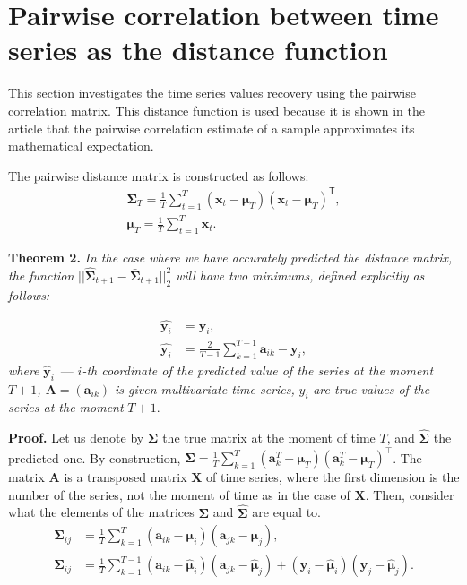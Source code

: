 \documentclass{article}
\begin{document}
\section{Pairwise correlation between time series as the distance function}

This section investigates the time series values recovery using the pairwise correlation matrix. This distance function is used because it is shown in the article\cite{puchkin2023sharper} that the pairwise correlation estimate of a sample approximates its mathematical expectation.

The pairwise distance matrix is constructed as follows:
\begin{gather*}
	{\mathbf{\Sigma}}_T = \frac{1}{T} \sum_{t=1}^{T} (\mathbf{x}_t - \boldsymbol{\mu}_T)(\mathbf{x}_t - \boldsymbol{\mu}_T)^\mathsf{T},\\
	\boldsymbol{\mu}_T = \frac{1}{T} \sum_{t=1}^{T} \mathbf{x}_t.
\end{gather*}

\textbf{Theorem 2.} \textit{In the case where we have accurately predicted the distance matrix, the function} $||\hat{\mathbf{\Sigma}}_{t+1} - \bar{\mathbf{\Sigma}}_{t+1}||_2^2$ \textit{will have two minimums, defined explicitly as follows:}

\begin{align*}
	\hat{\mathbf{y}_i} &= \mathbf{y}_i,\\
	\hat{\mathbf{y}_i} &= \frac{2}{T-1} \sum_{k=1}^{T-1} \mathbf{a}_{ik} - \mathbf{y}_i,
\end{align*}
\textit{where} $\hat{\mathbf{y}}_i$~--- $i$\textit{-th coordinate of the predicted value of the series at the moment $T+1$, $\mathbf{A}=(\mathbf{a}_{ik})$ is given multivariate time series,} $y_i$ \textit{are true values of the series at the moment} $T+1$.

\textbf{Proof.} Let us denote by $\mathbf{\Sigma}$ the true matrix at the moment of time $T$, and $\hat{\mathbf{\Sigma}}$ the predicted one. By construction, ${\mathbf{\Sigma}} = \frac{1}{T} \sum_{k=1}^{T} (\mathbf{a}^T_k - \boldsymbol{\mu}_T)(\mathbf{a}^T_k - \boldsymbol{\mu}_T)^\intercal\texttt{}$. The matrix $\mathbf{A}$ is a transposed matrix $\mathbf{X}$ of time series, where the first dimension is the number of the series, not the moment of time as in the case of $\mathbf{X}$. Then, consider what the elements of the matrices $\mathbf{\Sigma}$ and $\hat{\mathbf{\Sigma}}$ are equal to.
\begin{align*}
	\mathbf{\Sigma}_{ij} &= \frac{1}{T}\sum_{k=1}^{T}(\mathbf{a}_{ik} - \boldsymbol{\mu}_i)(\mathbf{a}_{jk}-\boldsymbol{\mu}_j),\\
	\hat{\mathbf{\Sigma}}_{ij} &= \frac{1}{T}\sum_{k=1}^{T-1}(\mathbf{a}_{ik} - \hat{\boldsymbol{\mu}}_i)(\mathbf{a}_{jk}-\hat{\boldsymbol{\mu}}_j) + (\mathbf{y}_i - \hat{\boldsymbol{\mu}}_i)(\mathbf{y}_j - \hat{\boldsymbol{\mu}}_j).
\end{align*}
\end{document}
